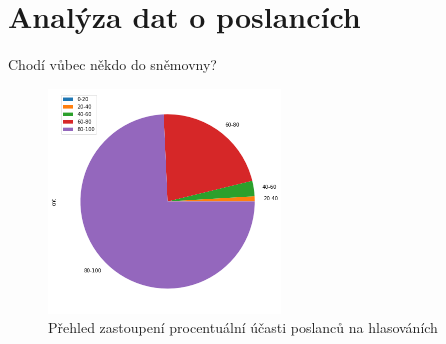 \documentclass[10pt]{beamer}
\begin{document}
\section{Analýza dat o poslancích}

\begin{frame}{Chodí vůbec někdo do sněmovny?}

\begin{figure}
    \centering
    \includegraphics[width=0.55\textwidth]{pie.png}
    \caption{Přehled zastoupení procentuální účasti poslanců na hlasováních}
    \label{fig:presence_pie}
\end{figure}

\end{frame}
\end{document}
